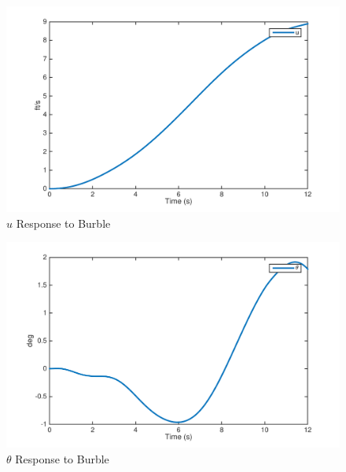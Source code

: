 \documentclass[12pt]{article}
\begin{document}
\begin{figure}[h!]
\begin{center}
\includegraphics[height=.4\textheight]{figures/1_u}
\caption{$u$ Response to Burble}
\end{center}
\end{figure}

\begin{figure}[h!]
\begin{center}
\includegraphics[height=.4\textheight]{figures/1_theta}
\caption{$\theta$ Response to Burble}
\end{center}
\end{figure}
\end{document}
